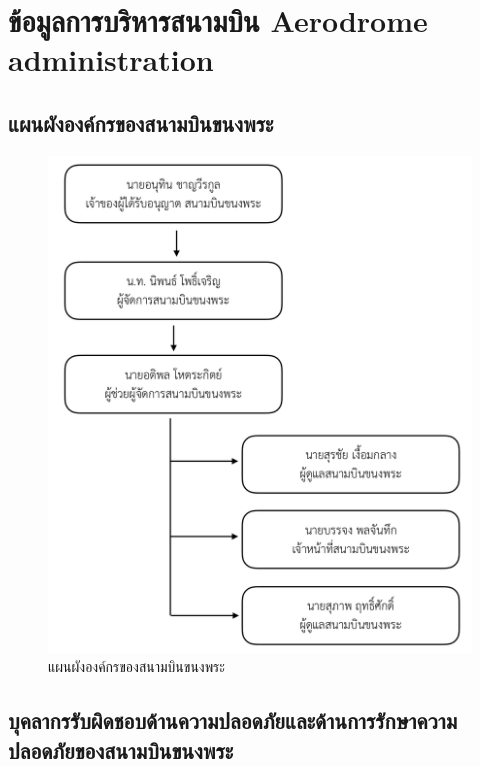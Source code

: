 
\chapter{ข้อมูลการบริหารสนามบิน
Aerodrome administration}

\section{แผนผังองค์กรของสนามบินขนงพระ}

\begin{figure}[ht]
\begin{center}
\includegraphics[scale=0.5]{KNP_Org_Chart.png}
\caption{แผนผังองค์กรของสนามบินขนงพระ}
\label{แผนผังองค์กรของสนามบินขนงพระ}
\end{center}
\end{figure}

\newpage

\section{บุคลากรรับผิดชอบด้านความปลอดภัยและด้านการรักษาความปลอดภัยของสนามบินขนงพระ}

